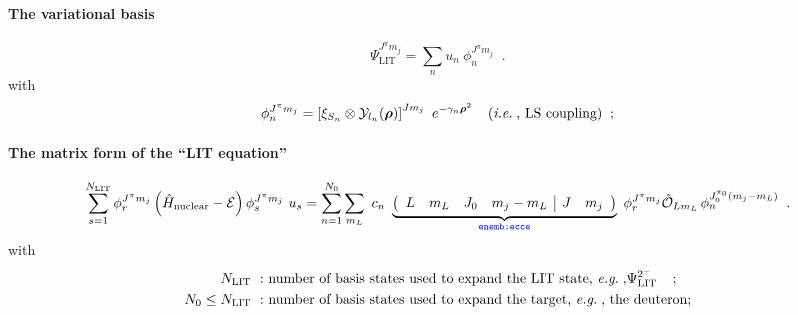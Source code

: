 \documentclass[onecolumn,preprint,superscriptaddress,nofootinbib,notitlepage,10pt,linenumbers]{revtex4-1}
\newcommand{\blue}[1]{\color{blue}{#1}}
\newcommand{\eg}{\textit{e.g.}\;}
\newcommand{\ie}{\textit{i.e.}\;}
\newcommand{\be}{\begin{equation}}
\newcommand{\ee}{\end{equation}}
\newcommand{\la}{\label}
\newcommand{\ve}[1]{\ensuremath{\boldsymbol{#1}}}
\newcommand{\clg}[6]{\ensuremath{\left(\begin{array}{cccc|cc}#1 & #2 & #3 & #4 & #5 & #6 \end{array}\right)}}
\newcommand{\E}{\mathcal{E}}
\begin{document}
\paragraph{The variational basis}
\be\la{eq.basis}
\Psi_\text{LIT}^{J^\pi m_j}=\sum\limits_nu_n~\phi^{J^\pi m_j}_n\;\;.
\ee
with
\begin{align}\la{eq.basis.descr}
\phi^{J^\pi m_j}_n=\left[\xi_{S_n}\otimes\mathcal{Y}_{l_n}(\ve{\rho})\right]^{J m_j}~e^{-\gamma_n\ve{\rho}^2}\;\;\;\;(\text{\ie, LS coupling})\;\;;
\end{align}

\paragraph{The matrix form of the ``LIT equation''}
\be\la{eq.liteq.mat}
\sum\limits_{s=1}^{N_\text{LIT}}\phi^{J^\pi m_j}_r\left(\hat{H}_\text{nuclear}-\E\right)\phi^{J^\pi m_j}_s~u_s=
\sum\limits_{n=1}^{N_0}\sum\limits_{m_L}~c_n~\underbrace{\clg{L}{m_L}{J_0}{m_j-m_L}{J}{m_j}}_{\blue{\texttt{enemb:ecce}}}~\phi^{J^\pi m_j}_r\hat{\mathcal{O}}_{Lm_L}\,\phi^{J_0^{\pi_0}(m_j-m_L)}_n\;\;.
\ee
with
\begin{align}\la{eq.liteq.mat.descr}
N_\text{LIT}~:&~\text{number of basis states used to expand the LIT state, \eg,} \Psi_\text{LIT}^{2^-}\;\;\;\;;\\
N_0\leq N_\text{LIT}~:&~\text{number of basis states used to expand the target, \eg, the deuteron;}\\
\end{align}
\end{document}
